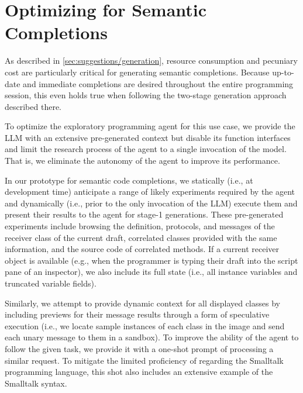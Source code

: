 
\section{Optimizing for Semantic Completions}
\label{sec:agent/completions}

As described in \cref{sec:suggestions/generation}, resource consumption and pecuniary cost are particularly critical for generating semantic completions.
Because up-to-date and immediate completions are desired throughout the entire programming session, this even holds true when following the two-stage generation approach described there.

To optimize the exploratory programming agent for this use case, we provide the LLM with an extensive pre-generated context but disable its function interfaces and limit the research process of the agent to a single invocation of the model.
That is, we eliminate the autonomy of the agent to improve its performance.

In our prototype for semantic code completions, we statically (i.e., at development time) anticipate a range of likely experiments required by the agent and dynamically (i.e., prior to the only invocation of the LLM) execute them and present their results to the agent for stage-1 generations.
These pre-generated experiments include browsing the definition, protocols, and messages of the receiver class of the current draft, correlated classes provided with the same information, and the source code of correlated methods.
If a current receiver object is available (e.g., when the programmer is typing their draft into the script pane of an inspector), we also include its full state (i.e., all instance variables and truncated variable fields).

Similarly, we attempt to provide dynamic context for all displayed classes by including previews for their message results through a form of speculative execution (i.e., we locate sample instances of each class in the image and send each unary message to them in a sandbox).
To improve the ability of the agent to follow the given task, we provide it with a one-shot prompt of processing a similar request.
To mitigate the limited proficiency of \gptfouro regarding the Smalltalk programming language, this shot also includes an extensive example of the Smalltalk syntax.

